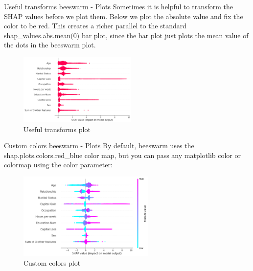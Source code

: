 \documentclass[aspectratio=169]{beamer}
\begin{document}
\begin{frame}{Useful transforms beeswarm - Plots}
Sometimes it is helpful to transform the \ac{SHAP} values before we plot them. Below we plot the absolute value and fix the color to be red. This creates a richer parallel to the standard shap\_values.abs.mean(0) bar plot, since the bar plot just plots the mean value of the dots in the beeswarm plot.
    \begin{figure}[htbp]
        \centering
        \includegraphics[width=0.52\textwidth]{figs/shap/plots/beeswarm/example_notebooks_api_examples_plots_beeswarm_9_0.png}
        \caption{Useful transforms plot}
        \label{fig:transforms-beeswarm}
    \end{figure}
\end{frame}

\begin{frame}{Custom colors beeswarm - Plots}
By default, beeswarm uses the shap.plots.colors.red\_blue color map, but you can pass any matplotlib color or colormap using the color parameter:
    \begin{figure}[htbp]
        \centering
        \includegraphics[width=0.6\textwidth]{figs/shap/plots/beeswarm/example_notebooks_api_examples_plots_beeswarm_12_0.png}
        \caption{Custom colors plot}
        \label{fig:custom-beeswarm}
    \end{figure}
\end{frame}
\end{document}

